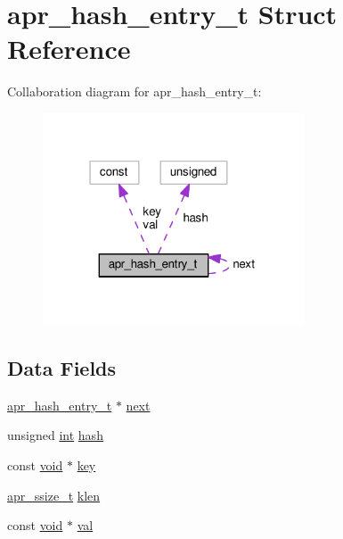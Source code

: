 \hypertarget{structapr__hash__entry__t}{}\section{apr\+\_\+hash\+\_\+entry\+\_\+t Struct Reference}
\label{structapr__hash__entry__t}


Collaboration diagram for apr\+\_\+hash\+\_\+entry\+\_\+t\+:
\nopagebreak
\begin{figure}[H]
\begin{center}
\leavevmode
\includegraphics[width=220pt]{structapr__hash__entry__t__coll__graph}
\end{center}
\end{figure}
\subsection*{Data Fields}
\begin{DoxyCompactItemize}
\item 
\hyperlink{structapr__hash__entry__t}{apr\+\_\+hash\+\_\+entry\+\_\+t} $\ast$ \hyperlink{structapr__hash__entry__t_a70b5a560daa40a433bd1d6c3a6bf7235}{next}
\item 
unsigned \hyperlink{pcre_8txt_a42dfa4ff673c82d8efe7144098fbc198}{int} \hyperlink{structapr__hash__entry__t_a0bb553f964ba81c3dd8e8a39df647d89}{hash}
\item 
const \hyperlink{group__MOD__ISAPI_gacd6cdbf73df3d9eed42fa493d9b621a6}{void} $\ast$ \hyperlink{structapr__hash__entry__t_a8890dc3c4f444309ed7db536372b6170}{key}
\item 
\hyperlink{group__apr__platform_ga215ebb88932bee220b766263ebbfe6fa}{apr\+\_\+ssize\+\_\+t} \hyperlink{structapr__hash__entry__t_aa3d8eea12d8ad7c90824b7d5435e3b34}{klen}
\item 
const \hyperlink{group__MOD__ISAPI_gacd6cdbf73df3d9eed42fa493d9b621a6}{void} $\ast$ \hyperlink{structapr__hash__entry__t_ac9510a7b109a9987a5262dce203c021a}{val}
\end{DoxyCompactItemize}


